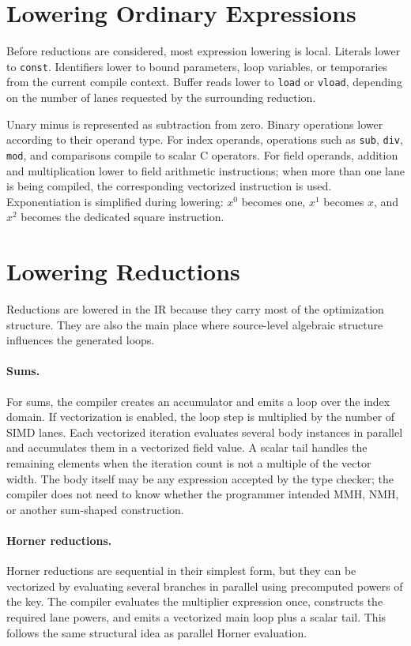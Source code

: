 \section{Lowering Ordinary Expressions}
\label{sec:lowering-expressions}

Before reductions are considered, most expression lowering is local. Literals lower to \texttt{const}. Identifiers lower to bound parameters, loop variables, or temporaries from the current compile context. Buffer reads lower to \texttt{load} or \texttt{vload}, depending on the number of lanes requested by the surrounding reduction.

Unary minus is represented as subtraction from zero. Binary operations lower according to their operand type. For index operands, operations such as \texttt{sub}, \texttt{div}, \texttt{mod}, and comparisons compile to scalar C operators. For field operands, addition and multiplication lower to field arithmetic instructions; when more than one lane is being compiled, the corresponding vectorized instruction is used. Exponentiation is simplified during lowering: \(x^0\) becomes one, \(x^1\) becomes \(x\), and \(x^2\) becomes the dedicated square instruction.

\section{Lowering Reductions}
\label{sec:lowering-reductions}

Reductions are lowered in the IR because they carry most of the optimization structure. They are also the main place where source-level algebraic structure influences the generated loops.

\paragraph{Sums.}
For sums, the compiler creates an accumulator and emits a loop over the index domain. If vectorization is enabled, the loop step is multiplied by the number of SIMD lanes. Each vectorized iteration evaluates several body instances in parallel and accumulates them in a vectorized field value. A scalar tail handles the remaining elements when the iteration count is not a multiple of the vector width. The body itself may be any expression accepted by the type checker; the compiler does not need to know whether the programmer intended MMH, NMH, or another sum-shaped construction.

\paragraph{Horner reductions.}
Horner reductions are sequential in their simplest form, but they can be vectorized by evaluating several branches in parallel using precomputed powers of the key. The compiler evaluates the multiplier expression once, constructs the required lane powers, and emits a vectorized main loop plus a scalar tail. This follows the same structural idea as parallel Horner evaluation.

